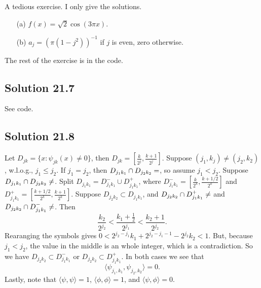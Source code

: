 A tedious exercise.
I only give the solutions.
\begin{enumerate}
    \item[(a)] $f(x) = \sqrt{2} \cos(3 \pi x)$.
    \item[(b)] $a_j = (\pi (1 - j^2))^{-1}$ if $j$ is even, zero otherwise.
\end{enumerate}
The rest of the exercise is in the code.


\subsection*{Solution 21.7}

See code.


\subsection*{Solution 21.8}

Let $D_{jk} = \{x : \psi_{jk}(x) \neq 0\}$, then $D_{jk} = \left[\frac{k}{2^j}, \frac{k + 1}{2^j}\right]$.
Suppose $(j_1, k_j) \neq (j_2, k_2)$, w.l.o.g., $j_1 \leq j_2$.
If $j_1 = j_2$, then $D_{j_1 k_1} \cap D_{j_2 k_2} = \empty$, so assume $j_1 < j_2$.
Suppose $D_{j_1 k_1} \cap D_{j_2 k_2} \neq \empty$.
Split $D_{j_1 k_1} = D_{j_1 k_1}^- \cup D_{j_1 k_1}^+$, where $D_{j_1 k_1}^- = \left[\frac{k}{2^k}, \frac{k + 1/2}{2^k}\right]$ and $D_{j_1 k_1}^+ = \left[\frac{k + 1/2}{2^k}, \frac{k + 1}{2^k}\right]$.
Suppose $D_{j_2 k_2} \subset D_{j_1 k_1}$, and $D_{j_2 k_2} \cap D_{j_1 k_1}^+ \neq \empty$ and $D_{j_2 k_2} \cap D_{j_1 k_1}^- \neq \empty$.
Then
\begin{equation*}
    \frac{k_2}{2^{j_2}} < \frac{k_1 + \frac{1}{2}}{2^{j_1}} < \frac{k_2 + 1}{2^{j_2}}.
\end{equation*}
Rearanging the symbols gives $0 < 2^{j_2 - j_1} k_1 + 2^{j_2 - j_1 - 1} - 2^{j_2}k_2 < 1$.
But, because $j_1 < j_2$, the value in the middle is an whole integer, which is a contradiction.
So we have $D_{j_2 k_2} \subset D_{j_1 k_1}^-$ or $D_{j_2 k_2} \subset D_{j_1 k_1}^+$.
In both cases we see that
\begin{equation*}
    \langle \psi_{j_1, k_1}, \psi_{j_2, k_2} \rangle = 0.
\end{equation*}
Lastly, note that $\langle \psi, \psi \rangle = 1$, $\langle \phi, \phi \rangle = 1$, and $\langle \psi, \phi \rangle = 0$.

